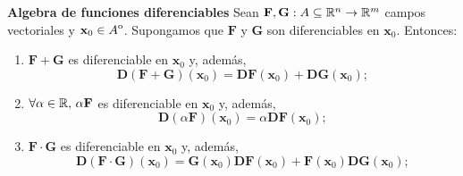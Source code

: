 \begin{propertie}\label{prop:alg_dif_gen}  \textbf{Algebra de funciones diferenciables}  Sean $\mathbf{F},\mathbf{G}:A  \subseteq  \mathbb{R}^n \to \mathbb{R}^{m}$ campos vectoriales y $\mathbf{x}_0 \in {\kern0ptA}^{\mathrm{o}}$. Supongamos que $\mathbf{F}$ y $\mathbf{G}$ son diferenciables en $\mathbf{x}_0$.
  Entonces:
  \begin{enumerate} 
   \item[1.] $\mathbf{F} + \mathbf{G}$ es diferenciable en $\mathbf{x}_0$ y, adem\'as,
   \[
    \boldsymbol{D} (\mathbf{F+G})(\mathbf{x}_0) = \boldsymbol{D} \mathbf{F}(\mathbf{x}_0) + \boldsymbol{D} \mathbf{G}(\mathbf{x}_0);
   \]

   \item[2.] $\forall \alpha \in \mathbb{R}, \,  \alpha \mathbf{F}$  es diferenciable en $\mathbf{x}_0$ y, adem\'as,
   \[
    \boldsymbol{D}(\alpha \mathbf{F})(\mathbf{x}_0) = \alpha \boldsymbol{D} \mathbf{F}(\mathbf{x}_0);
   \]

   \item[3.] $\mathbf{F} \cdot \mathbf{G}$ es diferenciable en $\mathbf{x}_0$ y, adem\'as,
   \[
    \boldsymbol{D}(\mathbf{F} \cdot \mathbf{G})(\mathbf{x}_0) = \mathbf{G}(\mathbf{x}_0) \boldsymbol{D} \mathbf{F}(\mathbf{x}_0) + \mathbf{F}(\mathbf{x}_0) \boldsymbol{D}  \mathbf{G}(\mathbf{x}_0);
   \]
\end{enumerate}
\end{propertie}



